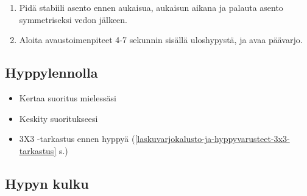 \begin{multicols}{2}
\begin{enumerate}[label=\bfseries \arabic*)]
\item  Pidä stabiili asento ennen aukaisua, aukaisun aikana ja palauta asento symmetriseksi vedon jälkeen. 
\item  Aloita avaustoimenpiteet 4-7 sekunnin sisällä uloshypystä, ja avaa päävarjo. 
\end{enumerate}
\subsection{ Hyppylennolla }
\label{pl-alkeiskoulutuksen-suoritukset-hyppylennolla}

\begin{itemize}
\item Kertaa suoritus mielessäsi 
\item Keskity suoritukseesi 
\item 3X3 -tarkastus ennen hyppyä (\ref{laskuvarjokalusto-ja-hyppyvarusteet-3x3-tarkastus} s.\pageref{laskuvarjokalusto-ja-hyppyvarusteet-3x3-tarkastus}) 
\end{itemize}
\subsection{ Hypyn kulku }
\label{pl-alkeiskoulutuksen-suoritukset-hypyn-kulku}


\end{multicols}
